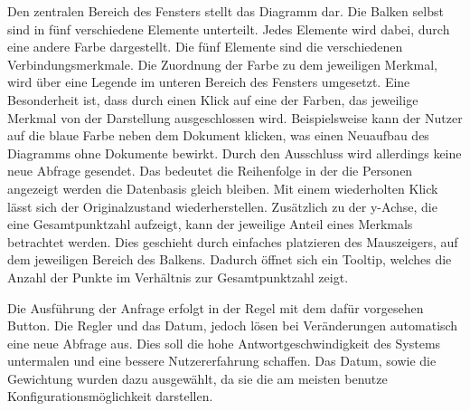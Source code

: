 Den zentralen Bereich des Fensters stellt das Diagramm dar. Die Balken selbst sind in fünf verschiedene Elemente unterteilt. Jedes Elemente wird dabei, durch eine andere Farbe dargestellt. Die fünf Elemente sind die verschiedenen Verbindungsmerkmale. Die Zuordnung der Farbe zu dem jeweiligen Merkmal, wird über eine Legende im unteren Bereich des Fensters umgesetzt. Eine Besonderheit ist, dass durch einen Klick auf eine der Farben, das jeweilige Merkmal von der Darstellung ausgeschlossen wird. Beispielsweise kann der Nutzer auf die blaue Farbe neben dem Dokument klicken, was einen Neuaufbau des Diagramms ohne Dokumente bewirkt. Durch den Ausschluss wird allerdings keine neue Abfrage gesendet. Das  bedeutet die Reihenfolge in der die Personen angezeigt werden die Datenbasis gleich  bleiben. Mit einem wiederholten Klick lässt sich der Originalzustand wiederherstellen. Zusätzlich zu der y-Achse, die eine Gesamtpunktzahl aufzeigt, kann der jeweilige Anteil eines Merkmals betrachtet werden. Dies geschieht durch einfaches platzieren des Mauszeigers, auf dem jeweiligen Bereich des Balkens. Dadurch öffnet sich ein Tooltip, welches die Anzahl der Punkte im Verhältnis zur Gesamtpunktzahl zeigt.

Die Ausführung der Anfrage erfolgt in der Regel mit dem dafür vorgesehen Button. Die Regler und das Datum, jedoch lösen bei Veränderungen automatisch eine neue Abfrage aus. Dies soll die hohe Antwortgeschwindigkeit des Systems untermalen und eine bessere Nutzererfahrung schaffen. Das Datum, sowie die Gewichtung wurden dazu ausgewählt, da sie die am meisten benutze Konfigurationsmöglichkeit darstellen.

